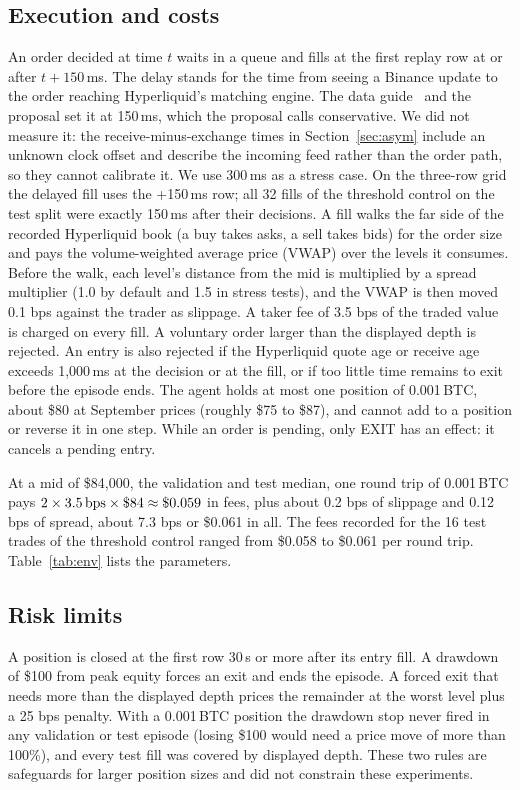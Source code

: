\documentclass[12pt,a4paper]{article}
\DeclareRobustCommand{\bps}{\ifmmode\,\text{bps}\else\,bps\fi}
\begin{document}
\subsection{Execution and costs}
An order decided at time $t$ waits in a queue and fills at the first replay row at or after
$t+150$\,ms. The delay stands for the time from seeing a Binance update to the order reaching
Hyperliquid's matching engine. The data guide~\cite{guide} and the proposal set it at
150\,ms, which the proposal calls conservative. We did not measure it: the receive-minus-exchange times in
Section~\ref{sec:asym} include an unknown clock offset and describe the incoming feed rather
than the order path, so they cannot calibrate it. We use 300\,ms as a stress case. On the
three-row grid the delayed fill uses the +150\,ms row; all 32 fills of the threshold control
on the test split were exactly 150\,ms after their decisions. A fill walks the far side of
the recorded Hyperliquid book (a buy takes asks, a sell takes bids) for the order size and
pays the volume-weighted average price (VWAP) over the levels it consumes. Before the walk,
each level's distance from the mid is multiplied by a spread multiplier (1.0 by default and
1.5 in stress tests), and the VWAP is then moved 0.1\bps{} against the trader as slippage. A
taker fee of 3.5\bps{} of the traded value is charged on every fill. A voluntary order larger
than the displayed depth is rejected. An entry is also rejected if the Hyperliquid quote age
or receive age exceeds 1,000\,ms at the decision or at the fill, or if too little time
remains to exit before the episode ends. The agent holds at most one position of
0.001\,BTC, about \$80 at September prices (roughly \$75 to \$87), and cannot add to a
position or reverse it in one step. While an order is pending, only EXIT has an effect: it
cancels a pending entry.

At a mid of \$84,000, the validation and test median, one round trip of 0.001\,BTC pays
$2\times3.5\bps\times\$84\approx\$0.059$ in fees, plus about 0.2\bps{} of slippage and
0.12\bps{} of spread, about 7.3\bps{} or \$0.061 in all. The fees recorded for the 16 test
trades of the threshold control ranged from \$0.058 to \$0.061 per round trip.
Table~\ref{tab:env} lists the parameters.

\subsection{Risk limits}
A position is closed at the first row 30\,s or more after its entry fill. A drawdown of
\$100 from peak equity forces an exit and ends the episode. A forced exit that needs more
than the displayed depth prices the remainder at the worst level plus a 25\bps{} penalty.
With a 0.001\,BTC position the drawdown stop never fired in any validation or test episode
(losing \$100 would need a price move of more than 100\%), and every test fill was covered by
displayed depth. These two rules are safeguards for larger position sizes and did not
constrain these experiments.
\end{document}

